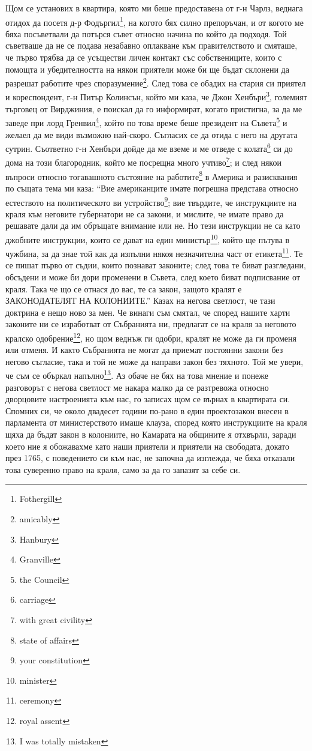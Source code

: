 \documentclass[12pt]{book}
\begin{document}
Щом се установих в квартира, която ми беше предоставена от г-н Чарлз, веднага отидох да посетя д-р Фодъргил\footnote{Fothergill}, на когото бях силно препоръчан, и от когото ме бяха посъветвали да потърся съвет относно начина по който да подходя. Той съветваше да не се подава незабавно оплакване към правителството и смяташе, че първо трябва да се усъществи личен контакт със собствениците, които с помощта и убедителността на някои приятели може би ще бъдат склонени да разрешат работите чрез споразумение\footnote{amicably}. След това се обадих на стария си приятел и кореспондент, г-н Питър Колинсън, който ми каза, че Джон Хенбъри\footnote{Hanbury}, големият търговец от Вирджиния, е поискал да го информират, когато пристигна, за да ме заведе при лорд Гренвил\footnote{Granville}, който по това време беше президент на Съвета\footnote{the Council} и желаел да ме види възможно най-скоро. Съгласих се да отида с него на другата сутрин. Съответно г-н Хенбъри дойде да ме вземе и ме отведе с колата\footnote{carriage} си до дома на този благородник, който ме посрещна много учтиво\footnote{with great civility}; и след някои въпроси относно тогавашното състояние на работите\footnote{state of affairs} в Америка и разисквания по същата тема ми каза: “Вие американците имате погрешна представа относно естеството на политическото ви устройство\footnote{your constitution}; вие твърдите, че инструкциите на краля към неговите губернатори не са закони, и мислите, че имате право да решавате дали да им обръщате внимание или не. Но тези инструкции не са като джобните инструкции, които се дават на един министър\footnote{minister}, който ще пътува в чужбина, за да знае той как да изпълни някоя незначителна част от етикета\footnote{ceremony}. Те се пишат първо от съдии, които познават законите; след това те биват разгледани, обсъдени и може би дори променени в Съвета, след което биват подписвание от краля. Така че що се отнася до вас, те са закон, защото кралят е ЗАКОНОДАТЕЛЯТ НА КОЛОНИИТЕ.” Казах на негова светлост, че тази доктрина е нещо ново за мен. Че винаги съм смятал, че според нашите харти законите ни се изработват от Събранията ни, предлагат се на краля за неговото кралско одобрение\footnote{royal assent}, но щом веднъж ги одобри, кралят не може да ги променя или отменя. И както Събранията не могат да приемат постоянни закони без негово съгласие, така и той не може да направи закон без тяхното. Той ме увери, че съм се объркал напълно\footnote{I was totally mistaken}. Аз обаче не бях на това мнение и понеже разговорът с негова светлост ме накара малко да се разтревожа относно дворцовите настроенията към нас, го записах щом се върнах в квартирата си. Спомних си, че около двадесет години по-рано в един проектозакон внесен в парламента от министерството имаше клауза, според която инструкциите на краля щяха да бъдат закон в колониите, но Камарата на общините я отхвърли, заради което ние я обожавахме като наши приятели и приятели на свободата, докато през 1765, с поведението си към нас, не започна да изглежда, че бяха отказали това суверенно право на краля, само за да го запазят за себе си.
\end{document}
